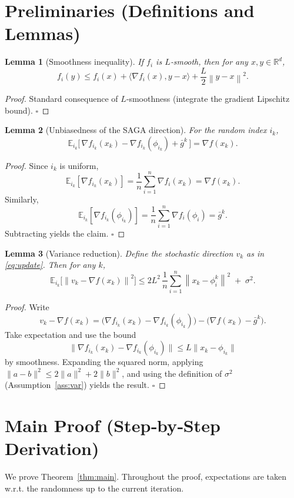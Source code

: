 \documentclass{article}
\newtheorem{lemma}{Lemma}
\newcommand{\E}{\mathbb{E}}
\newcommand{\R}{\mathbb{R}}
\newcommand{\norm}[1]{\left\|#1\right\|}
\newcommand{\grad}{\nabla}
\begin{document}
\section*{Preliminaries (Definitions and Lemmas)}

\begin{lemma}[Smoothness inequality]\label{lem:smooth}
If $f_i$ is $L$‑smooth, then for any $x,y\in\R^{d}$,
\[
f_i(y)\le f_i(x)+\langle\grad f_i(x),y-x\rangle+\frac{L}{2}\norm{y-x}^{2}.
\]
\end{lemma}
\begin{proof}
Standard consequence of $L$‑smoothness (integrate the gradient Lipschitz bound). \hfill $\square$
\end{proof}

\begin{lemma}[Unbiasedness of the SAGA direction]\label{lem:unbiased}
For the random index $i_k$,
\[
\E_{i_k}\!\bigl[\,\grad f_{i_k}(x_k)-\grad f_{i_k}(\phi_{i_k})+\bar g^{k}\,\bigr]
= \grad f(x_k).
\]
\end{lemma}
\begin{proof}
Since $i_k$ is uniform,
\[
\E_{i_k}[\grad f_{i_k}(x_k)]=\frac{1}{n}\sum_{i=1}^{n}\grad f_i(x_k)=\grad f(x_k).
\]
Similarly,
\[
\E_{i_k}[\grad f_{i_k}(\phi_{i_k})]=\frac{1}{n}\sum_{i=1}^{n}\grad f_i(\phi_i)=\bar g^{k}.
\]
Subtracting yields the claim. \hfill $\square$
\end{proof}

\begin{lemma}[Variance reduction]\label{lem:variance-reduction}
Define the stochastic direction $v_k$ as in \eqref{eq:update}. Then for any $k$,
\[
\E_{i_k}\!\bigl[\norm{v_k-\grad f(x_k)}^{2}\bigr]
\le 2L^{2}\,\frac{1}{n}\sum_{i=1}^{n}\norm{x_k-\phi_i^{k}}^{2}
\;+\;\sigma^{2}.
\]
\end{lemma}
\begin{proof}
Write
\[
v_k-\grad f(x_k)=\bigl(\grad f_{i_k}(x_k)-\grad f_{i_k}(\phi_{i_k})\bigr)
-\bigl(\grad f(x_k)-\bar g^{k}\bigr).
\]
Take expectation and use the bound
\[
\|\grad f_{i_k}(x_k)-\grad f_{i_k}(\phi_{i_k})\|
\le L\|x_k-\phi_{i_k}\|
\]
by smoothness. Expanding the squared norm, applying $\|a-b\|^{2}\le 2\|a\|^{2}+2\|b\|^{2}$, and using the definition of $\sigma^{2}$ (Assumption~\ref{ass:var}) yields the result. \hfill $\square$
\end{proof}

\section*{Main Proof (Step‑by‑Step Derivation)}
We prove Theorem~\ref{thm:main}. Throughout the proof, expectations are taken w.r.t. the randomness up to the current iteration.
\end{document}
